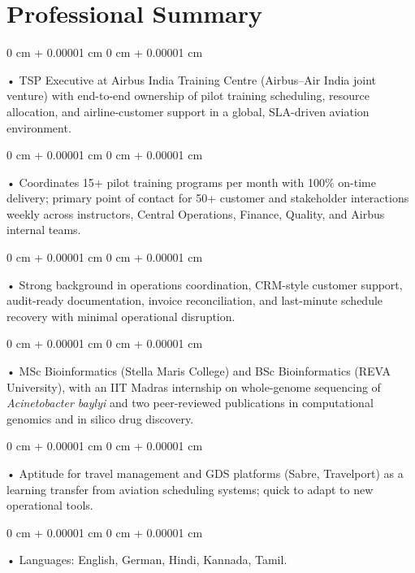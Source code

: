 \documentclass[10pt, letterpaper]{article}
\newenvironment{onecolentry}{
    \begin{adjustwidth}{
        0 cm + 0.00001 cm
    }{
        0 cm + 0.00001 cm
    }
}{
    \end{adjustwidth}
} %
\begin{document}
    \section{Professional Summary}
        \vspace{2 pt }
        \begin{onecolentry}
            • TSP Executive at Airbus India Training Centre (Airbus--Air India joint venture) with end-to-end ownership of pilot training scheduling, resource allocation, and airline-customer support in a global, SLA-driven aviation environment.
        \end{onecolentry}
        \begin{onecolentry}
            • Coordinates 15+ pilot training programs per month with 100\% on-time delivery; primary point of contact for 50+ customer and stakeholder interactions weekly across instructors, Central Operations, Finance, Quality, and Airbus internal teams.
        \end{onecolentry}
        \begin{onecolentry}
            • Strong background in operations coordination, CRM-style customer support, audit-ready documentation, invoice reconciliation, and last-minute schedule recovery with minimal operational disruption.
        \end{onecolentry}
        \begin{onecolentry}
            • MSc Bioinformatics (Stella Maris College) and BSc Bioinformatics (REVA University), with an IIT Madras internship on whole-genome sequencing of \textit{Acinetobacter baylyi} and two peer-reviewed publications in computational genomics and in silico drug discovery.
        \end{onecolentry}
        \begin{onecolentry}
            • Aptitude for travel management and GDS platforms (Sabre, Travelport) as a learning transfer from aviation scheduling systems; quick to adapt to new operational tools.
        \end{onecolentry}
        \begin{onecolentry}
            • Languages: English, German, Hindi, Kannada, Tamil.
        \end{onecolentry}

    \vspace{2 pt }
\end{document}
